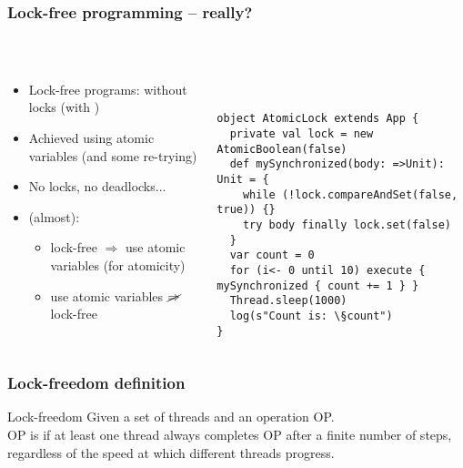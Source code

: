 \documentclass[aspectratio=169]{beamer}
\begin{document}
\begin{frame}[fragile]\frametitle{Lock-free programming -- really?}
~\\[-8mm]
\begin{columns}
\begin{column}{0.48\textwidth}
\begin{itemize}
  \item \alert{Lock-free programs}: without locks (with )
  \item Achieved using \alert{atomic variables} (and some re-trying)
  \item No locks, no deadlocks...
  \pause
  \item (almost):
    \begin{itemize}
      \item lock-free $\Rightarrow$ use atomic variables (for atomicity)
      \item use atomic variables $\cancel\Rightarrow$ lock-free
    \end{itemize}
  \pause
\end{itemize}
\end{column}
\begin{column}{0.54\textwidth}
~\\
\begin{lstlisting}[emph={execute,sleep,log,compareAndSet,mySynchronized,AtomicBoolean}]
object AtomicLock extends App {
  private val lock = new AtomicBoolean(false)
  def mySynchronized(body: =>Unit): Unit = {
    while (!lock.compareAndSet(false, true)) {}
    try body finally lock.set(false)
  }
  var count = 0
  for (i<- 0 until 10) execute { mySynchronized { count += 1 } }
  Thread.sleep(1000)
  log(s"Count is: \§count")
}
\end{lstlisting}
\end{column}
\end{columns}
\end{frame}  


\begin{frame}\frametitle{Lock-freedom definition}

\begin{alertblock}{Lock-freedom}
  Given a set of threads and an operation \alert{OP}.
  \\
  \alert{OP} is  if at least one thread always completes \alert{OP} after a finite number of steps, regardless of the speed at which different threads progress.
\end{alertblock}
\end{frame}
\end{document}
